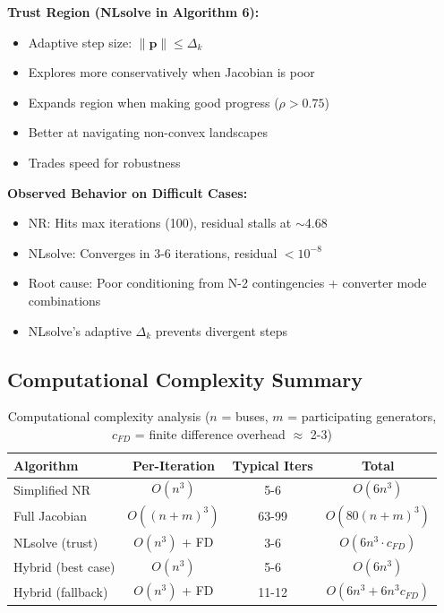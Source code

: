\documentclass[11pt]{article}
\begin{document}
\textbf{Trust Region (NLsolve in Algorithm 6):}
\begin{itemize}
    \item Adaptive step size: $\|\mathbf{p}\| \leq \Delta_k$
    \item Explores more conservatively when Jacobian is poor
    \item Expands region when making good progress ($\rho > 0.75$)
    \item Better at navigating non-convex landscapes
    \item Trades speed for robustness
\end{itemize}

\textbf{Observed Behavior on Difficult Cases:}
\begin{itemize}
    \item NR: Hits max iterations (100), residual stalls at $\sim$4.68
    \item NLsolve: Converges in 3-6 iterations, residual $< 10^{-8}$
    \item Root cause: Poor conditioning from N-2 contingencies + converter mode combinations
    \item NLsolve's adaptive $\Delta_k$ prevents divergent steps
\end{itemize}

\subsection{Computational Complexity Summary}

\begin{table}[h]
\centering
\begin{tabular}{l|c|c|c}
\hline
Algorithm & Per-Iteration & Typical Iters & Total \\
\hline
Simplified NR & $O(n^3)$ & 5-6 & $O(6n^3)$ \\
Full Jacobian & $O((n+m)^3)$ & 63-99 & $O(80(n+m)^3)$ \\
NLsolve (trust) & $O(n^3)$ + FD & 3-6 & $O(6n^3 \cdot c_{FD})$ \\
Hybrid (best case) & $O(n^3)$ & 5-6 & $O(6n^3)$ \\
Hybrid (fallback) & $O(n^3)$ + FD & 11-12 & $O(6n^3 + 6n^3 c_{FD})$ \\
\hline
\end{tabular}
\caption{Computational complexity analysis ($n$ = buses, $m$ = participating generators, $c_{FD}$ = finite difference overhead $\approx$ 2-3)}
\end{table}
\end{document}
